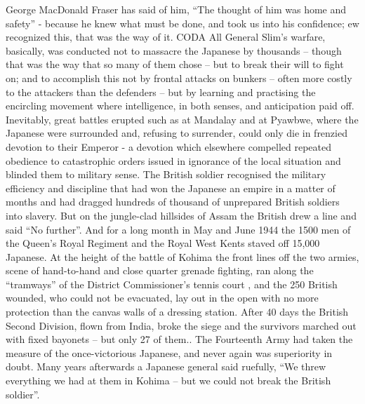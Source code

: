   George MacDonald Fraser has said of him, “The thought of him was home and safety”  -  because he knew what must be done, and took us into his confidence; ew recognized this, that was the way of it.        
                                                                 CODA
 All General Slim’s  warfare, basically, was conducted not to massacre the Japanese by thousands – though that was the way that so many of them chose – but to break their will to fight on; and to accomplish this not by  frontal attacks on bunkers – often more costly to the attackers than the defenders – but by learning and practising  the encircling movement  where intelligence, in both senses, and anticipation paid off.  Inevitably, great battles erupted such as at Mandalay and at Pyawbwe, where the Japanese were surrounded  and,  refusing to surrender, could only die in frenzied devotion  to their Emperor -  a devotion which elsewhere compelled repeated obedience to catastrophic orders issued in ignorance of the local situation and blinded them to military sense. 
  The British soldier recognised the military efficiency and discipline that had won the Japanese an empire in a matter of months and had dragged hundreds of thousand of unprepared British soldiers into slavery. But on the jungle-clad hillsides of Assam the British drew a line and said “No further”. And for a long month in May and June 1944  the 1500 men of the Queen’s Royal Regiment and the Royal West Kents staved off 15,000  Japanese. At the height of the battle of Kohima   the front lines off the two armies, scene of hand-to-hand and close quarter grenade fighting, ran along the “tramways” of the District Commissioner’s tennis court , and the 250 British wounded, who could not be evacuated, lay out in the open with no  more protection than the canvas walls of a dressing station. After 40 days the British Second Division, flown from India, broke the siege  and the survivors marched out with fixed bayonets – but only 27 of them.. The Fourteenth Army had taken the measure of the once-victorious Japanese, and never again was superiority in doubt. Many years afterwards a Japanese general said ruefully, “We threw everything we had at them in Kohima – but we could not break the British soldier”.

 
 







	







                                        









   


 




















